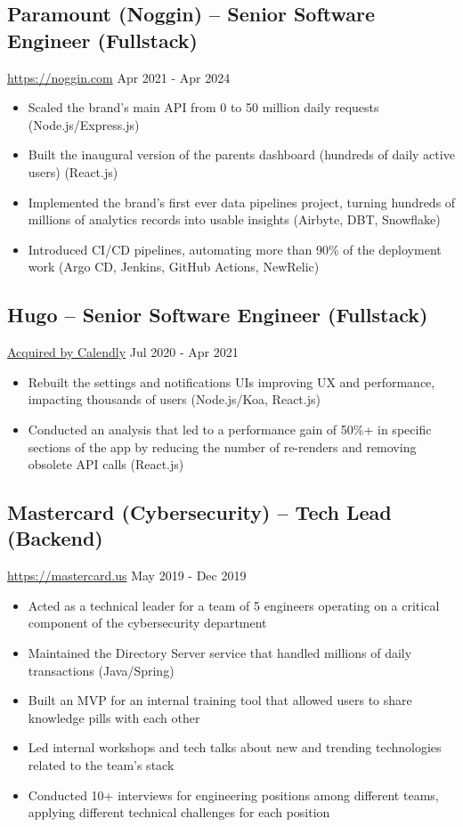 \documentclass[11pt, a4paper]{article}
\begin{document}
\subsection*{Paramount (Noggin) -- Senior Software Engineer (Fullstack)}
\href{https://www.noggin.com}{https://noggin.com} \hfill Apr 2021 - Apr 2024
\begin{itemize}[noitemsep]
    \item Scaled the brand's main API from 0 to 50 million daily requests (Node.js/Express.js)
    \item Built the inaugural version of the parents dashboard (hundreds of daily active users) (React.js)
    \item Implemented the brand's first ever data pipelines project, turning hundreds of millions of analytics records into usable insights (Airbyte, DBT, Snowflake)
    \item Introduced CI/CD pipelines, automating more than 90\% of the deployment work (Argo CD, Jenkins, GitHub Actions, NewRelic)
\end{itemize}

\subsection*{Hugo -- Senior Software Engineer (Fullstack)}
\href{https://www.linkedin.com/company/hugo-team/}{Acquired by Calendly} \hfill Jul 2020 - Apr 2021
\begin{itemize}[noitemsep]
    \item Rebuilt the settings and notifications UIs improving UX and performance, impacting thousands of users (Node.js/Koa, React.js)
    \item Conducted an analysis that led to a performance gain of 50\%+ in specific sections of the app by reducing the number of re-renders and removing obsolete API calls (React.js)
\end{itemize}

\subsection*{Mastercard (Cybersecurity) -- Tech Lead (Backend)}
\href{https://www.mastercard.us/en-us.html}{https://mastercard.us} \hfill May 2019 - Dec 2019
\begin{itemize}[noitemsep]
    \item Acted as a technical leader for a team of 5 engineers operating on a critical component of the cybersecurity department
    \item Maintained the Directory Server service that handled millions of daily transactions (Java/Spring)
    \item Built an MVP for an internal training tool that allowed users to share knowledge pills with each other
    \item Led internal workshops and tech talks about new and trending technologies related to the team's stack
    \item Conducted 10+ interviews for engineering positions among different teams, applying different technical challenges for each position
\end{itemize}
\end{document}
